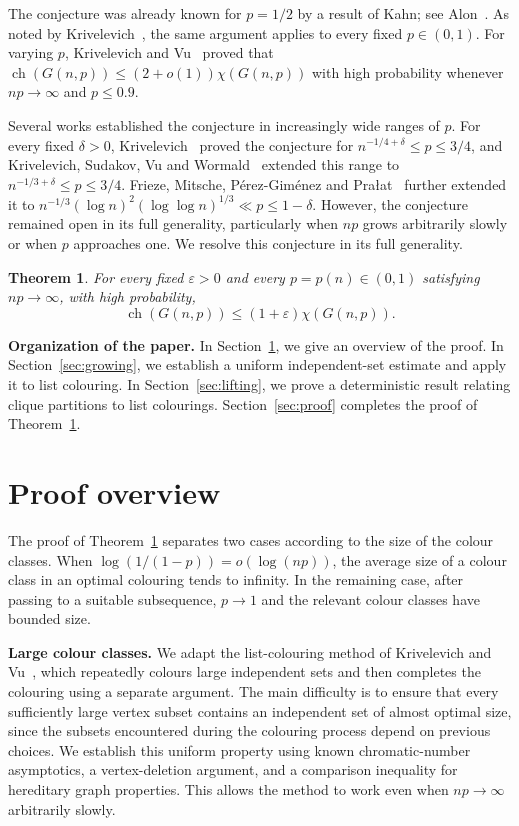 \documentclass[11pt]{article}
\newtheorem{theorem}{Theorem}[section]
\numberwithin{equation}{section}
\newcommand{\ch}{\operatorname{ch}}
\begin{document}
The conjecture was already known for $p=1/2$ by
a result of Kahn; see Alon~\cite[Proposition~4.4]{Alon1993}.
As noted by Krivelevich~\cite{Krivelevich2000},
the same argument applies to every fixed
$p\in(0,1)$. For varying $p$, Krivelevich and
Vu~\cite{KV} proved that
$\ch(G(n,p))\le(2+o(1))\chi(G(n,p))$
with high probability whenever $np\to\infty$
and $p\le0.9$.


Several works established the conjecture in increasingly
wide ranges of $p$. For every fixed $\delta>0$,
Krivelevich~\cite{Krivelevich2000} proved the conjecture
for $n^{-1/4+\delta}\le p\le3/4$, and
Krivelevich, Sudakov, Vu and Wormald~\cite{KSVW2003}
extended this range to
$n^{-1/3+\delta}\le p\le3/4$.
Frieze, Mitsche, P\'erez-Gim\'enez and
Pra{\l}at~\cite{FMPP2015} further extended it to
$
 n^{-1/3}(\log n)^2(\log\log n)^{1/3}
 \ll p\le1-\delta.
$
However, the conjecture remained open in its full
generality, particularly when $np$ grows arbitrarily
slowly or when $p$ approaches one.
We resolve this conjecture in its full generality.

\begin{theorem}\label{thm:main}
For every fixed $\varepsilon>0$ and every
$p=p(n)\in(0,1)$ satisfying $np\to\infty$,
with high probability,
\[
 \ch(G(n,p))\le(1+\varepsilon)\chi(G(n,p)).
\]
\end{theorem}



\medskip
\noindent\textbf{Organization of the paper.}
In Section~\ref{sec:overview}, we give an overview of the proof.
In Section~\ref{sec:growing}, we establish a uniform
independent-set estimate and apply it to list colouring.
In Section~\ref{sec:lifting}, we prove a deterministic result
relating clique partitions to list colourings.
Section~\ref{sec:proof} completes the proof of
Theorem~\ref{thm:main}.


\section{Proof overview}\label{sec:overview}

The proof of Theorem~\ref{thm:main} separates two cases
according to the size of the colour classes. When
$\log(1/(1-p))=o(\log(np))$, the average size of a colour
class in an optimal colouring tends to infinity.
In the remaining case, after passing to a suitable
subsequence, $p\to1$ and the relevant colour classes
have bounded size. 

\medskip
\noindent\textbf{Large colour classes.}
We adapt the list-colouring method of Krivelevich and
Vu~\cite{KV}, which repeatedly colours large independent
sets and then completes the colouring using a separate
argument. The main difficulty is to ensure that every
sufficiently large vertex subset contains an independent
set of almost optimal size, since the subsets encountered
during the colouring process depend on previous choices.
We establish this uniform property using known
chromatic-number asymptotics, a vertex-deletion argument,
and a comparison inequality for hereditary graph
properties. This allows the method to work even when
$np\to\infty$ arbitrarily slowly.
\end{document}
